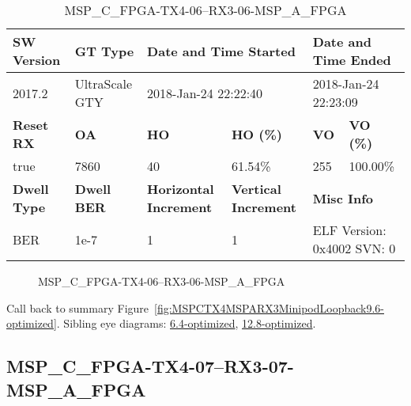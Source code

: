 \begin{table}[h]
\centering
\caption{MSP\_C\_FPGA-TX4-06--RX3-06-MSP\_A\_FPGA}
\label{tab:MSPCFPGATX406RX306MSPAFPGA9.6-optimized}
\begin{tabular}{@{}|l|l|l|l|l|l|@{}}
\toprule
\textbf{SW Version}                & \textbf{GT Type}   & \multicolumn{2}{l|}{\textbf{Date and Time Started}}            & \multicolumn{2}{l|}{\textbf{Date and Time Ended}}        \\ \midrule
2017.2                       & UltraScale GTY          & \multicolumn{2}{l|}{2018-Jan-24 22:22:40}                   & \multicolumn{2}{l|}{2018-Jan-24 22:23:09}               \\ \midrule
\textbf{Reset RX}                  & \textbf{OA} & \textbf{HO}   & \textbf{HO (\%)} & \textbf{VO} & \textbf{VO (\%)} \\ \midrule
true & 7860        & 40          & 61.54\%        & 255        & 100.00\%       \\ \midrule
\textbf{Dwell Type}                & \textbf{Dwell BER} & \textbf{Horizontal Increment} & \textbf{Vertical Increment}    & \multicolumn{2}{l|}{\textbf{Misc Info}}                  \\ \midrule
BER                            & 1e-7        & 1        & 1           & \multicolumn{2}{l|}{ELF Version: 0x4002 SVN: 0}                         \\ \bottomrule
\end{tabular}
\end{table}

\begin{figure}[h]
\caption{MSP\_C\_FPGA-TX4-06--RX3-06-MSP\_A\_FPGA} \label{fig:MSPCFPGATX406RX306MSPAFPGA9.6-optimized}
\end{figure}

Call back to summary Figure~\ref{fig:MSPCTX4MSPARX3MinipodLoopback9.6-optimized}.
Sibling eye diagrams: \hyperref[sec:MSPCFPGATX406RX306MSPAFPGA6.4-optimized]{6.4-optimized}, \hyperref[sec:MSPCFPGATX406RX306MSPAFPGA12.8-optimized]{12.8-optimized}.

\clearpage
\newpage


\subsection{MSP\_C\_FPGA-TX4-07--RX3-07-MSP\_A\_FPGA}\label{sec:MSPCFPGATX407RX307MSPAFPGA9.6-optimized}


